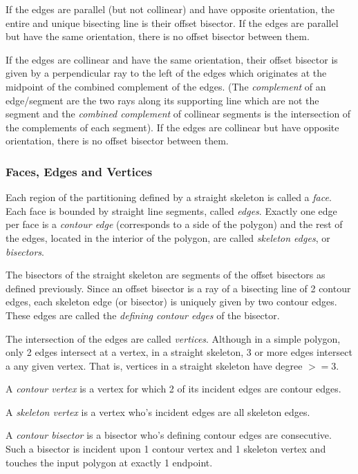 If the edges are parallel (but not collinear) and have opposite
orientation, the entire and unique bisecting line is their offset
bisector. If the edges are parallel but have the same orientation,
there is no offset bisector between them.

If the edges are collinear and have the same orientation, their offset
bisector is given by a perpendicular ray to the left of the edges
which originates at the midpoint of the combined complement of
the edges. (The {\em complement} of an edge/segment are the two
rays along its supporting line which are not the segment and the
{\em combined complement} of  collinear segments is the
intersection of the complements of each segment). If the edges are
collinear but have opposite orientation, there is no offset bisector
between them.


\subsubsection{Faces, Edges and Vertices}

Each region of the partitioning defined by a straight skeleton is
called a {\em face}. Each face is bounded by straight line segments,
called {\em edges}. Exactly one edge per face is a {\em contour edge}
(corresponds to a side of the polygon) and the rest of the edges,
located in the interior of the polygon, are called {\em skeleton
edges}, or {\em bisectors}.

The bisectors of the straight skeleton are segments of the offset
bisectors as defined previously. Since an offset bisector is a ray of
a bisecting line of 2 contour edges, each skeleton edge (or bisector)
is uniquely given by two contour edges. These edges are called the
{\em defining contour edges} of the bisector.

The intersection of the edges are called {\em vertices}. Although in a
simple polygon, only 2 edges intersect at a vertex, in a straight
skeleton, 3 or more edges intersect a any given vertex. That is, vertices in a
straight skeleton have degree $>=3$.

A {\em contour vertex} is a vertex for which 2 of its incident edges are contour edges.

A {\em skeleton vertex} is a vertex who's incident edges are all skeleton edges.

A {\em contour bisector} is a bisector who's defining contour edges
are consecutive. Such a bisector is incident upon 1 contour vertex and
1 skeleton vertex and touches the input polygon at exactly 1 endpoint.

